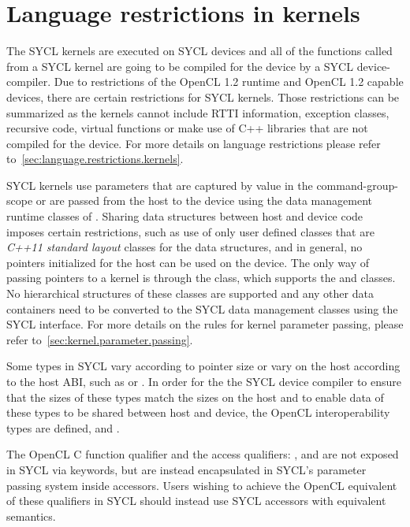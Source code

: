 \section{Language restrictions in kernels}

The SYCL \glspl{kernel} are executed on SYCL devices and all of the functions called
from a SYCL kernel are going to be compiled for the device by a SYCL 
\gls{device-compiler}. Due to restrictions of the OpenCL 1.2 runtime and 
OpenCL 1.2 capable
devices, there are certain restrictions for SYCL kernels. Those restrictions can
be summarized as the kernels cannot include RTTI information, exception classes,
recursive code, virtual functions or make use of C++ libraries that are not
compiled for the device. For more details on language restrictions please refer
to~\ref{sec:language.restrictions.kernels}.

SYCL kernels use parameters that are captured by value in the 
\gls{command-group-scope} or are passed from the
host to the device using the data management runtime classes of
. Sharing data structures between host and
device code imposes certain restrictions, such as use of only user defined
classes that are \emph{C++11 standard layout} classes for the data structures,
and in general, no pointers initialized for the host can be used on the device. The
only way of passing pointers to a kernel is through the
 class, which supports the
 and  classes. No
hierarchical structures of these classes are supported and any other data
containers need to be converted to the SYCL data management classes using the
SYCL interface. For more details on the rules for kernel parameter passing,
please refer to~\ref{sec:kernel.parameter.passing}.

Some types in SYCL vary according to pointer size or vary on the host
according to the host ABI, such as  or . In order
for the the SYCL device compiler to ensure that the sizes of
these types match the sizes on the host and to enable data of these types
to be shared between host and device, the OpenCL interoperability types
are defined,  and .

The OpenCL C function qualifier  and the access
qualifiers: ,  and 
are not exposed in SYCL via keywords, but are instead encapsulated in
SYCL's parameter passing system inside accessors. Users wishing to
achieve the OpenCL equivalent of these qualifiers in SYCL should
instead use SYCL accessors with equivalent semantics.

